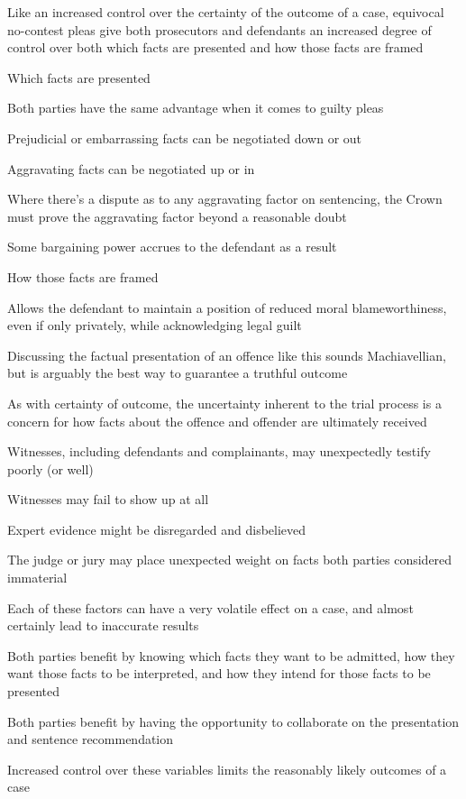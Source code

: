 Like an increased control over the certainty of the outcome of a case, equivocal no-contest pleas give both prosecutors and defendants an increased degree of control over both which facts are presented and how those facts are framed

Which facts are presented

Both parties have the same advantage when it comes to guilty pleas

Prejudicial or embarrassing facts can be negotiated down or out

Aggravating facts can be negotiated up or in

Where there's a dispute as to any aggravating factor on sentencing, the Crown must prove the aggravating factor beyond a reasonable doubt

Some bargaining power accrues to the defendant as a result

How those facts are framed

Allows the defendant to maintain a position of reduced moral blameworthiness, even if only privately, while acknowledging legal guilt

Discussing the factual presentation of an offence like this sounds Machiavellian, but is arguably the best way to guarantee a truthful outcome

As with certainty of outcome, the uncertainty inherent to the trial process is a concern for how facts about the offence and offender are ultimately received

Witnesses, including defendants and complainants, may unexpectedly testify poorly (or well)

Witnesses may fail to show up at all

Expert evidence might be disregarded and disbelieved

The judge or jury may place unexpected weight on facts both parties considered immaterial

Each of these factors can have a very volatile effect on a case, and almost certainly lead to inaccurate results

Both parties benefit by knowing which facts they want to be admitted, how they want those facts to be interpreted, and how they intend for those facts to be presented

Both parties benefit by having the opportunity to collaborate on the presentation and sentence recommendation

Increased control over these variables limits the reasonably likely outcomes of a case

